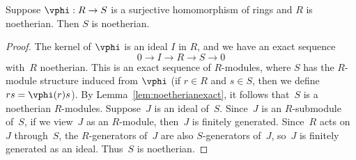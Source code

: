 \begin{lemma}\label{lem:surjnoetherian}
	Suppose $\vphi:R\to S$ is a surjective homomorphism of
	rings and $R$ is noetherian. Then $S$ is noetherian.
\end{lemma}
\begin{proof}
	The kernel of $\vphi$ is an ideal $I$ in $R$, and
	we have an exact sequence
	$$
		0 \to I \to R \to S \to 0
	$$
	with~$R$ noetherian.
	This is an exact sequence of $R$-modules, where $S$ has the
	$R$-module structure induced from $\vphi$ (if $r\in R$
	and $s\in S$, then we define $rs = \vphi(r)s$).
	By Lemma~\ref{lem:noetherianexact}, it follows
	that~$S$ is a noetherian $R$-modules. Suppose~$J$ is an ideal of~$S$.
	Since~$J$ is an $R$-submodule of~$S$, if we view~$J$ as an $R$-module,
	then~$J$ is finitely generated. Since~$R$ acts on~$J$ through~$S$,
	the $R$-generators of~$J$ are also $S$-generators of~$J$, so~$J$
	is finitely generated as an ideal. Thus~$S$ is noetherian.
\end{proof}

